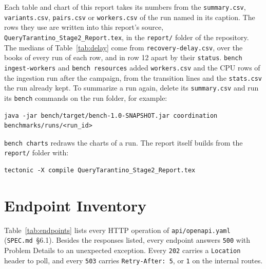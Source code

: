 \documentclass[11pt,a4paper]{article}
\newcommand{\code}[1]{\nolinkurl{#1}}
\newcommand{\spec}[1]{\code{SPEC.md}~\S#1}
\begin{document}
Each table and chart of this report takes its numbers from the \code{summary.csv}, \code{variants.csv},
\code{pairs.csv} or \code{workers.csv} of the run named in its caption. The rows they use are written into this
report's source, \code{QueryTarantino_Stage2_Report.tex}, in the \code{report/} folder of the repository. The medians of
Table~\ref{tab:delay} come from \code{recovery-delay.csv}, over the books of every run of each row, and in row 12 apart
by their \code{status}. \code{bench ingest-workers} and \code{bench resources} added \code{workers.csv} and the CPU rows
of the ingestion run after the campaign, from the transition lines and the \code{stats.csv} the run already kept. To
summarize a run again, delete its \code{summary.csv} and run its \code{bench} commands on the run folder, for example:
\begin{lstlisting}
java -jar bench/target/bench-1.0-SNAPSHOT.jar coordination benchmarks/runs/<run_id>
\end{lstlisting}
\code{bench charts} redraws the charts of a run. The report itself builds from the \code{report/} folder with:
\begin{lstlisting}
tectonic -X compile QueryTarantino_Stage2_Report.tex
\end{lstlisting}
\clearpage
\section{Endpoint Inventory}
\label{app:endpoints}

Table~\ref{tab:endpoints} lists every HTTP operation of \code{api/openapi.yaml} (\spec{6.1}). Besides the responses
listed, every endpoint answers \code{500} with Problem Details to an unexpected exception. Every \code{202} carries a
\code{Location} header to poll, and every \code{503} carries \code{Retry-After: 5}, or \code{1} on the internal routes.
\end{document}
